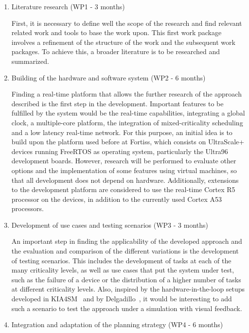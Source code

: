 \begin{enumerate}
	\item	Literature research (WP1 - 3 months)
	
	First, it is necessary to define well the scope of the research and find relevant related work and tools to base the work upon. This first work package involves a refinement of the structure of the work and the subsequent work packages. To achieve this, a broader literature is to be researched and summarized.
	
	\item	Building of the hardware and software system (WP2 - 6 months)
	
	Finding a real-time platform that allows the further research of the approach described is the first step in the development. Important features to be fulfilled by the system would be the real-time capabilities, integrating a global clock, a multiple-core platform, the integration of mixed-criticality scheduling and a low latency real-time network. For this purpose, an initial idea is to build upon the platform used before at Fortiss, which consists on UltraScale+ devices running FreeRTOS as operating system, particularly the Ultra96 development boards. However, research will be performed to evaluate other options and the implementation of some features using virtual machines, so that all development does not depend on hardware. Additionally, extensions to the development platform are considered to use the real-time Cortex R5 processor on the devices, in addition to the currently used Cortex A53 processors.
	
	\item	Development of use cases and testing scenarios (WP3 - 3 months)
	
	An important step in finding the applicability of the developed approach and the evaluation and comparison of the different variations is the development of testing scenarios. This includes the development of tasks at each of the many criticality levels, as well as use cases that put the system under test, such as the failure of a device or the distribution of a higher number of tasks at different criticality levels. Also, inspired by the hardware-in-the-loop setups developed in KIA4SM~\parencite{kia1} and by Delgadillo~\parencite{delgadillo1}, it would be interesting to add such a scenario to test the approach under a simulation with visual feedback.
	
	\item	Integration and adaptation of the planning strategy (WP4 - 6 months)
	

\end{enumerate}
